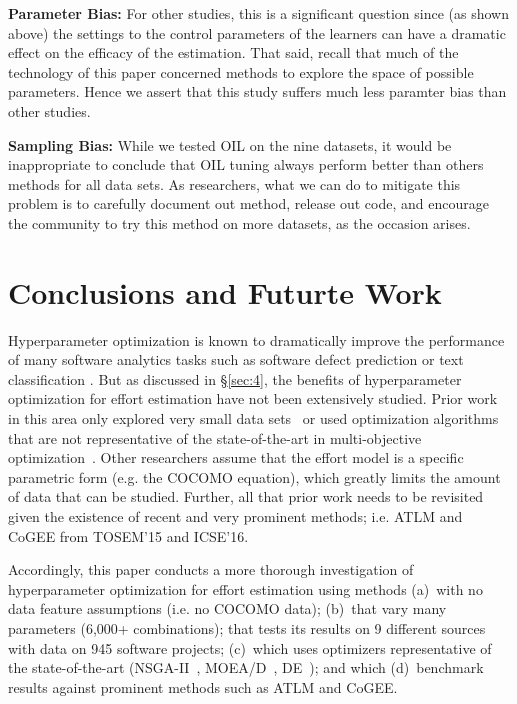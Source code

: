  \textbf{Parameter Bias:} For other studies, this is a significant question
 since (as shown above) the settings to the control parameters of the learners
 can have a dramatic effect on the efficacy of the estimation.
 That said, 
 recall that much of the technology of this paper concerned methods to explore
 the space of possible parameters.
 Hence we assert that 
 this study suffers much less paramter bias than other studies.
 


\textbf{Sampling Bias:} While we tested OIL on the nine datasets, it would be inappropriate to conclude that OIL tuning  always perform better than
others methods for all data sets.
As researchers, what we can do to mitigate this problem is to carefully document out method, release out code,
and encourage the community to try this method on more datasets, as the occasion arises.


\section{Conclusions and Futurte Work} \label{sect:conclusion}

Hyperparameter optimization is known to dramatically improve the performance of many software analytics tasks such as software defect prediction or 
 text classification \cite{Fu2016TuningFS,tanti18,AGRAWAL2018,agrawal2017better}.
But as discussed in   \S\ref{sec:4}, the  benefits of      hyperparameter  optimization for   effort estimation 
have not been extensively
studied.
Prior work in this area only explored very small data sets~\cite{li09} or used
optimization
  algorithms that are not representative of  the state-of-the-art in multi-objective optimization~\cite{li09,dejaeger12,Song:2013}.
Other researchers assume that the effort model is a specific parametric form (e.g. the COCOMO equation), which greatly limits the amount of data that can be studied.
Further, all that prior work needs to be revisited given the existence of recent and very prominent
methods; i.e. ATLM and CoGEE from TOSEM'15 and ICSE'16\cite{Whigham:2015,sarro2016multi}.

Accordingly, this paper conducts a  more thorough investigation of     hyperparameter   optimization for effort estimation
using methods (a)~with no   data
feature assumptions (i.e. no COCOMO data);
(b)~that
 vary
many  parameters (6,000+ combinations);
that    tests  its results   on 9 different sources with data on 945 software projects; 
(c)~which  uses optimizers   representative of the  state-of-the-art 
(NSGA-II~\cite{deb02}, MOEA/D~\cite{Zhang07}, DE~\cite{storn1997differential});
and which 
(d)~benchmark results 
against  prominent methods such as 
  ATLM and CoGEE.

